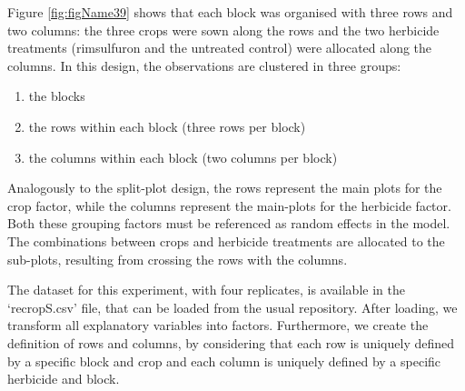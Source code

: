 \documentclass[a4paper,12pt,oneside]{book}
\providecommand{\tightlist}{%
  \setlength{\itemsep}{0pt}\setlength{\parskip}{0pt}}
\begin{document}
Figure \ref{fig:figName39} shows that each block was organised with three rows and two columns: the three crops were sown along the rows and the two herbicide treatments (rimsulfuron and the untreated control) were allocated along the columns. In this design, the observations are clustered in three groups:

\begin{enumerate}
\def\labelenumi{\arabic{enumi}.}
\tightlist
\item
  the blocks
\item
  the rows within each block (three rows per block)
\item
  the columns within each block (two columns per block)
\end{enumerate}

Analogously to the split-plot design, the rows represent the main plots for the crop factor, while the columns represent the main-plots for the herbicide factor. Both these grouping factors must be referenced as random effects in the model. The combinations between crops and herbicide treatments are allocated to the sub-plots, resulting from crossing the rows with the columns.

The dataset for this experiment, with four replicates, is available in the `recropS.csv' file, that can be loaded from the usual repository. After loading, we transform all explanatory variables into factors. Furthermore, we create the definition of rows and columns, by considering that each row is uniquely defined by a specific block and crop and each column is uniquely defined by a specific herbicide and block.
\end{document}
